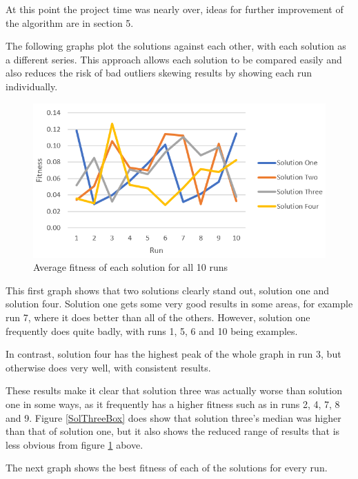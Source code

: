 \documentclass[sigconf]{acmart}
\begin{document}
At this point the project time was nearly over, ideas for further improvement of the algorithm are in section 5.

The following graphs plot the solutions against each other, with each solution as a different series. This approach allows each solution to be compared easily and also reduces the risk of bad outliers skewing results by showing each run individually.

\begin{figure}[H]
\includegraphics[width=\columnwidth]{averageFitnessAll.png}
\caption[width=\columnwidth]{Average fitness of each solution for all 10 runs} \label{avFitAll}
\end{figure}

This first graph shows that two solutions clearly stand out, solution one and solution four. Solution one gets some very good results in some areas, for example run 7, where it does better than all of the others. However, solution one frequently does quite badly, with runs 1, 5, 6 and 10 being examples.

In contrast, solution four has the highest peak of the whole graph in run 3, but otherwise does very well, with consistent results.

These results make it clear that solution three was actually worse than solution one in some ways, as it frequently has a higher fitness such as in runs 2, 4, 7, 8 and 9. Figure \ref{SolThreeBox} does show that solution three's median was higher than that of solution one, but it also shows the reduced range of results that is less obvious from figure \ref{avFitAll} above.

The next graph shows the best fitness of each of the solutions for every run.
\end{document}
